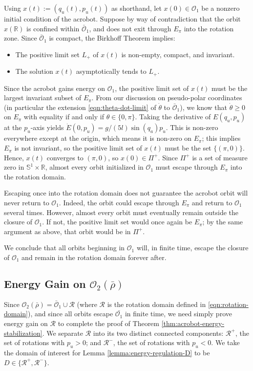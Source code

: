 \documentclass[journal,twoside,web]{ieeecolor}
\newcommand*{\R}{\mathbb{R}}
\newcommand*{\Sone}{\mathbb{S}^1}
\newcommand*{\SxR}{\Sone \times \R}
\begin{document}
{Using \(x(t) := (q_u(t),p_u(t))\) as shorthand, let
\(x(0) \in \mathcal{O}_1\) be a nonzero initial condition of the acrobot.
Suppose by way of contradiction that the orbit \(x(\R)\) is confined within 
\(\bar{\mathcal{O}}_1\), and does not exit through \(E_\pi\) into the rotation
zone.
Since \(\bar{\mathcal{O}}_1\) is compact, the Birkhoff Theorem \cite{birkhoff}
implies:
\begin{itemize}
    \item The positive limit set \(L_+\) of \(x(t)\) is non-empty, compact, and
        invariant.
    \item The solution \(x(t)\) asymptotically tends to \(L_+\).
\end{itemize}
Since the acrobot gains energy on \(\mathcal{O}_1\), the positive limit set of
\(x(t)\) must be the largest invariant subset of \(E_\pi\). 
From our discussion on pseudo-polar coordinates (in particular the extension
\ref{eqn:theta-dot-limit} of \(\dot{\theta}\) to \(\bar{\mathcal{O}}_1\)),
we know that \(\dot{\theta} \geq 0\) on \(E_\pi\) with equality if and only if 
\(\theta \in \{0,\pi\}\).
Taking the derivative of \(E(q_u,p_u)\) at the \(p_u\)-axis yields
\(\dot{E}(0,p_u) = g/(5l) \sin(q_a)p_u\).
This is non-zero everywhere except at the origin, which means it is non-zero on
\(E_\pi\); this implies \(E_\pi\) is not invariant, so the positive limit set of 
\(x(t)\) must be the set \(\{(\pi,0)\}\). Hence, \(x(t)\) converges to 
\((\pi,0)\), so \(x(0) \in \Pi^+\).
Since \(\Pi^+\) is a set of measure zero in \(\SxR\), almost every orbit
initialized in \(\mathcal{O}_1\) must escape through \(E_\pi\) into the rotation
domain.

Escaping once into the rotation domain does not guarantee the acrobot
orbit will never return to \(\mathcal{O}_1\).
Indeed, the orbit could escape through \(E_\pi\) and return to \(\mathcal{O}_1\)
several times.
However, almost every orbit must eventually remain outside the closure of 
\(\mathcal{O}_1\). 
If not, the positive limit set would once again be
\(E_\pi\); by the same argument as above, that orbit would be in \(\Pi^+\).

We conclude that all orbits beginning in \(\mathcal{O}_1\) will, in finite time,
escape the closure of \(\mathcal{O}_1\) and remain in the rotation domain
forever after.

\subsection{Energy Gain on \(\mathcal{O}_2(\bar{\rho})\)}
Since \(\mathcal{O}_2(\bar{\rho}) = \bar{\mathcal{O}}_1 \cup \mathcal{R}\)
(where \(\mathcal{R}\) is the rotation domain defined in
\eqref{eqn:rotation-domain}), and since all orbits escape 
\(\bar{\mathcal{O}_1}\) in finite time, we need simply prove energy gain on
\(\mathcal{R}\) to complete the proof of Theorem
\ref{thm:acrobot-energy-stabilization}.
We separate \(\mathcal{R}\) into its two distinct connected components:
\(\mathcal{R}^+\), the set of rotations with \(p_u > 0\); 
and \(\mathcal{R}^-\), the set of rotations with \(p_u < 0\).
We take the domain of interest for Lemma \ref{lemma:energy-regulation-D} to be
\(D \in \{\mathcal{R}^+, \mathcal{R}^-\}\).

}
\end{document}

